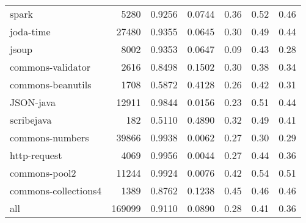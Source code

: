 \begin{table}
\begin{tabular}{lrrrrrr}
                  spark &    5280 &          0.9256 &          0.0744 &         0.36 &         0.52 &             0.46 \\
              joda-time &   27480 &          0.9355 &          0.0645 &         0.30 &         0.49 &             0.44 \\
                  jsoup &    8002 &          0.9353 &          0.0647 &         0.09 &         0.43 &             0.28 \\
      commons-validator &    2616 &          0.8498 &          0.1502 &         0.30 &         0.38 &             0.34 \\
      commons-beanutils &    1708 &          0.5872 &          0.4128 &         0.26 &         0.42 &             0.31 \\
              JSON-java &   12911 &          0.9844 &          0.0156 &         0.23 &         0.51 &             0.44 \\
             scribejava &     182 &          0.5110 &          0.4890 &         0.32 &         0.49 &             0.41 \\
        commons-numbers &   39866 &          0.9938 &          0.0062 &         0.27 &         0.30 &             0.29 \\
           http-request &    4069 &          0.9956 &          0.0044 &         0.27 &         0.44 &             0.36 \\
          commons-pool2 &   11244 &          0.9924 &          0.0076 &         0.42 &         0.54 &             0.51 \\
   commons-collections4 &    1389 &          0.8762 &          0.1238 &         0.45 &         0.46 &             0.46 \\
                    all &  169099 &          0.9110 &          0.0890 &         0.28 &         0.41 &             0.36 \\
\bottomrule
\end{tabular}
\end{table}
